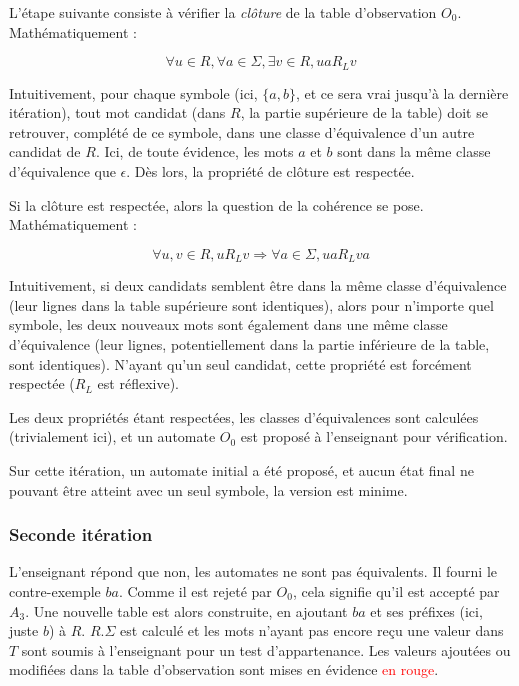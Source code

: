 \vspace{1cm}
L'étape suivante consiste à vérifier la \emph{clôture} de la table d'observation $O_0$. Mathématiquement :

$$ \forall u \in R, \forall a \in \Sigma, \exists v \in R, ua R_L v$$

Intuitivement, pour chaque symbole (ici, $\{a,b\}$, et ce sera vrai jusqu'à la dernière itération), tout mot candidat (dans $R$, la partie supérieure de la table) doit se retrouver, complété de ce symbole, dans une classe d'équivalence d'un autre candidat de $R$. Ici, de toute évidence, les mots $a$ et $b$ sont dans la même classe d'équivalence que $\epsilon$. Dès lors, la propriété de clôture est respectée.

Si la clôture est respectée, alors la question de la cohérence se pose. Mathématiquement :

$$ \forall u,v \in R, u R_L v \Rightarrow \forall a \in \Sigma, ua R_L va$$

Intuitivement, si deux candidats semblent être dans la même classe d'équivalence (leur lignes dans la table supérieure sont identiques), alors pour n'importe quel symbole, les deux nouveaux mots sont également dans une même classe d'équivalence (leur lignes, potentiellement dans la partie inférieure de la table, sont identiques). N'ayant qu'un seul candidat, cette propriété est forcément respectée ($R_L$ est réflexive).

Les deux propriétés étant respectées, les classes d'équivalences sont calculées (trivialement ici), et un automate $O_0$ est proposé à l'enseignant pour vérification.

Sur cette itération, un automate initial a été proposé, et aucun état final ne pouvant être atteint avec un seul symbole, la version est minime.

\subsubsection{Seconde itération}

L'enseignant répond que non, les automates ne sont pas équivalents. Il fourni le contre-exemple $ba$. Comme il est rejeté par $O_0$, cela signifie qu'il est accepté par $A_3$. Une nouvelle table est alors construite, en ajoutant $ba$ et ses préfixes (ici, juste $b$) à $R$. $R.\Sigma$ est calculé et les mots n'ayant pas encore reçu une valeur dans $T$ sont soumis à l'enseignant pour un test d'appartenance.
Les valeurs ajoutées ou modifiées dans la table d'observation sont mises en évidence \textcolor{red}{en rouge}.
\vspace{1cm}

